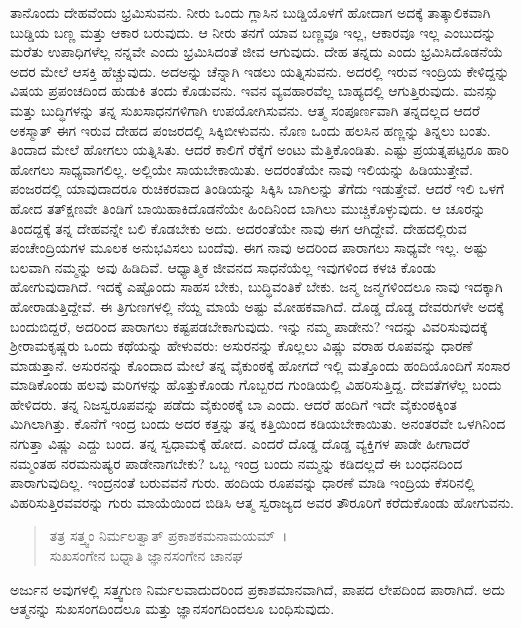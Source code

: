 ತಾನೊಂದು ದೇಹವೆಂದು ಭ್ರಮಿಸುವನು. ನೀರು ಒಂದು ಗ್ಲಾಸಿನ ಬುಡ್ಡಿಯೊಳಗೆ ಹೋದಾಗ ಅದಕ್ಕೆ ತಾತ್ಕಾಲಿಕವಾಗಿ ಬುಡ್ಡಿಯ ಬಣ್ಣ ಮತ್ತು ಆಕಾರ ಬರುವುದು. ಆ ನೀರು ತನಗೆ ಯಾವ ಬಣ್ಣವೂ ಇಲ್ಲ, ಆಕಾರವೂ ಇಲ್ಲ ಎಂಬುದನ್ನು ಮರೆತು ಉಪಾಧಿಗಳೆಲ್ಲ ನನ್ನವೇ ಎಂದು ಭ್ರಮಿಸಿದಂತೆ ಜೀವ ಆಗುವುದು. ದೇಹ ತನ್ನದು ಎಂದು ಭ್ರಮಿಸಿದೊಡನೆಯೆ ಅದರ ಮೇಲೆ ಆಸಕ್ತಿ ಹೆಚ್ಚುವುದು. ಅದಅನ್ನು ಚೆನ್ನಾಗಿ ಇಡಲು ಯತ್ನಿಸುವನು. ಅದರಲ್ಲಿ ಇರುವ ಇಂದ್ರಿಯ ಕೇಳಿದ್ದನ್ನು ವಿಷಯ ಪ್ರಪಂಚದಿಂದ ಹುಡುಕಿ ತಂದು ಕೊಡುವನು. ಇವನ ವ್ಯವಹಾರವೆಲ್ಲ ಬಾಹ್ಯದಲ್ಲಿ ಆಗುತ್ತಿರುವುದು. ಮನಸ್ಸು ಮತ್ತು ಬುದ್ಧಿಗಳನ್ನು ತನ್ನ ಸುಖಸಾಧನಗಳಿಗಾಗಿ ಉಪಯೋಗಿಸುವನು. ಆತ್ಮ ಸಂಪೂರ್ಣವಾಗಿ ತನ್ನದಲ್ಲದ ಆದರೆ ಅಕಸ್ಮಾತ್ ಈಗ ಇರುವ ದೇಹದ ಪಂಜರದಲ್ಲಿ ಸಿಕ್ಕಿಬೀಳುವನು. ನೊಣ ಒಂದು ಹಲಸಿನ ಹಣ್ಣನ್ನು ತಿನ್ನಲು ಬಂತು. ತಿಂದಾದ ಮೇಲೆ ಹೋಗಲು ಯತ್ನಿಸಿತು. ಆದರೆ ಕಾಲಿಗೆ ರೆಕ್ಕೆಗೆ ಅಂಟು ಮೆತ್ತಿಕೊಂಡಿತು. ಎಷ್ಟು ಪ್ರಯತ್ನಪಟ್ಟರೂ ಹಾರಿ ಹೋಗಲು ಸಾಧ್ಯವಾಗಲಿಲ್ಲ. ಅಲ್ಲಿಯೇ ಸಾಯಬೇಕಾಯಿತು. ಅದರಂತೆಯೇ ನಾವು ಇಲಿಯನ್ನು ಹಿಡಿಯುತ್ತೇವೆ. ಪಂಜರದಲ್ಲಿ ಯಾವುದಾದರೂ ರುಚಿಕರವಾದ ತಿಂಡಿಯನ್ನು ಸಿಕ್ಕಿಸಿ ಬಾಗಿಲನ್ನು ತೆಗೆದು ಇಡುತ್ತೇವೆ. ಆದರೆ ಇಲಿ ಒಳಗೆ ಹೋದ ತತ್​ಕ್ಷಣವೇ ತಿಂಡಿಗೆ ಬಾಯಿಹಾಕಿದೊಡನೆಯೇ ಹಿಂದಿನಿಂದ ಬಾಗಿಲು ಮುಚ್ಚಿಕೊಳ್ಳುವುದು. ಆ ಚೂರನ್ನು ತಿಂದದ್ದಕ್ಕೆ ತನ್ನ ದೇಹವನ್ನೇ ಬಲಿ ಕೊಡಬೇಕು ಅದು. ಅದರಂತೆಯೇ ನಾವು ಈಗ ಆಗಿದ್ದೇವೆ. ದೇಹದಲ್ಲಿರುವ ಪಂಚೇಂದ್ರಿಯಗಳ ಮೂಲಕ ಅನುಭವಿಸಲು ಬಂದೆವು. ಈಗ ನಾವು ಅದರಿಂದ ಪಾರಾಗಲು ಸಾಧ್ಯವೇ ಇಲ್ಲ. ಅಷ್ಟು ಬಲವಾಗಿ ನಮ್ಮನ್ನು ಅವು ಹಿಡಿದಿವೆ. ಆಧ್ಯಾತ್ಮಿಕ ಜೀವನದ ಸಾಧನೆಯೆಲ್ಲ ಇವುಗಳಿಂದ ಕಳಚಿ ಕೊಂಡು ಹೋಗುವುದಾಗಿದೆ. ಇದಕ್ಕೆ ಎಷ್ಟೊಂದು ಸಾಹಸ ಬೇಕು, ಬುದ್ಧಿವಂತಿಕೆ ಬೇಕು. ಜನ್ಮ ಜನ್ಮಗಳಿಂದಲೂ ನಾವು ಇದಕ್ಕಾಗಿ ಹೋರಾಡುತ್ತಿದ್ದೇವೆ. ಈ ತ್ರಿಗುಣಗಳಲ್ಲಿ ನೆಯ್ದ ಮಾಯೆ ಅಷ್ಟು ಮೋಹಕವಾಗಿದೆ. ದೊಡ್ಡ ದೊಡ್ಡ ದೇವರುಗಳೇ ಅದಕ್ಕೆ ಬಂದುಬಿದ್ದರೆ, ಅದರಿಂದ ಪಾರಾಗಲು ಕಷ್ಟಪಡಬೇಕಾಗುವುದು. ಇನ್ನು ನಮ್ಮ ಪಾಡೇನು? ಇದನ್ನು ವಿವರಿಸುವುದಕ್ಕೆ ಶ‍್ರೀರಾಮಕೃಷ್ಣರು ಒಂದು ಕಥೆಯನ್ನು ಹೇಳುವರು: ಅಸುರನನ್ನು ಕೊಲ್ಲಲು ವಿಷ್ಣು ವರಾಹ ರೂಪವನ್ನು ಧಾರಣೆ ಮಾಡುತ್ತಾನೆ. ಅಸುರನನ್ನು ಕೊಂದಾದ ಮೇಲೆ ತನ್ನ ವೈಕುಂಠಕ್ಕೆ ಹೋಗದೆ ಇಲ್ಲಿ ಮತ್ತೊಂದು ಹಂದಿಯೊಂದಿಗೆ ಸಂಸಾರ ಮಾಡಿಕೊಂಡು ಹಲವು ಮರಿಗಳನ್ನು ಹೊತ್ತುಕೊಂಡು ಗೊಬ್ಬರದ ಗುಂಡಿಯಲ್ಲಿ ವಿಹರಿಸುತ್ತಿದ್ದ. ದೇವತೆಗಳೆಲ್ಲ ಬಂದು ಹೇಳಿದರು. ತನ್ನ ನಿಜಸ್ವರೂಪವನ್ನು ಪಡೆದು ವೈಕುಂಠಕ್ಕೆ ಬಾ ಎಂದು. ಆದರೆ ಹಂದಿಗೆ ಇದೇ ವೈಕುಂಠಕ್ಕಿಂತ ಮಿಗಿಲಾಗಿತ್ತು. ಕೊನೆಗೆ ಇಂದ್ರ ಬಂದು ಅದರ ಕತ್ತನ್ನು ತನ್ನ ಕತ್ತಿಯಿಂದ ಕಡಿಯಬೇಕಾಯಿತು. ಅನಂತರವೇ ಒಳಗಿನಿಂದ ನಗುತ್ತಾ ವಿಷ್ಣು ಎದ್ದು ಬಂದ. ತನ್ನ ಸ್ವಧಾಮಕ್ಕೆ ಹೋದ. ಎಂದರೆ ದೊಡ್ಡ ದೊಡ್ಡ ವ್ಯಕ್ತಿಗಳ ಪಾಡೇ ಹೀಗಾದರೆ ನಮ್ಮಂತಹ ನರಮನುಷ್ಯರ ಪಾಡೇನಾಗಬೇಕು? ಒಬ್ಬ ಇಂದ್ರ ಬಂದು ನಮ್ಮನ್ನು ಕಡಿದಲ್ಲದೆ ಈ ಬಂಧನದಿಂದ ಪಾರಾಗುವುದಿಲ್ಲ. ಇಂದ್ರನಂತೆ ಬರುವವನೆ ಗುರು. ಹಂದಿಯ ರೂಪವನ್ನು ಧಾರಣೆ ಮಾಡಿ ಇಂದ್ರಿಯ ಕೆಸರಿನಲ್ಲಿ ವಿಹರಿಸುತ್ತಿರವವರನ್ನು ಗುರು ಮಾಯೆಯಿಂದ ಬಿಡಿಸಿ ಆತ್ಮ ಸ್ವರಾಜ್ಯದ ಅವರ ತೌರೂರಿಗೆ ಕರೆದುಕೊಂಡು ಹೋಗುವನು.

\begin{verse}
ತತ್ರ ಸತ್ತ್ವಂ ನಿರ್ಮಲತ್ವಾತ್ ಪ್ರಕಾಶಕಮನಾಮಯಮ್~।\\ಸುಖಸಂಗೇನ ಬಧ್ನಾತಿ ಜ್ಞಾನಸಂಗೇನ ಚಾನಘ 
\end{verse}

{\small ಅರ್ಜುನ ಅವುಗಳಲ್ಲಿ ಸತ್ತ್ವಗುಣ ನಿರ್ಮಲವಾದುದರಿಂದ ಪ್ರಕಾಶಮಾನವಾಗಿದೆ, ಪಾಪದ ಲೇಪದಿಂದ ಪಾರಾಗಿದೆ. ಅದು ಆತ್ಮನನ್ನು ಸುಖಸಂಗದಿಂದಲೂ ಮತ್ತು ಜ್ಞಾನಸಂಗದಿಂದಲೂ ಬಂಧಿಸುವುದು.}

